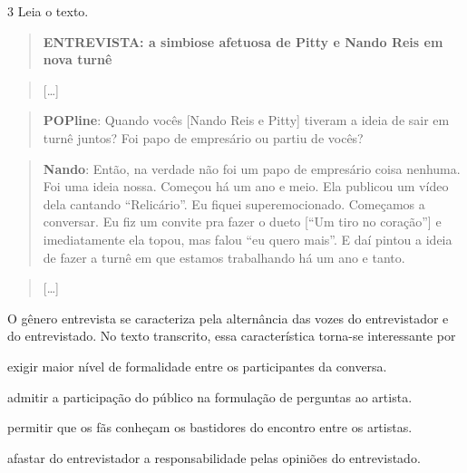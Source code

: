 \num{3} Leia o texto.

\begin{quote}
\textbf{ENTREVISTA: a simbiose afetuosa de Pitty e Nando Reis em nova
turnê}
\end{quote}

\begin{quote}
{[}\ldots{]}
\end{quote}

\begin{quote}
\textbf{POPline}: Quando vocês {[}Nando Reis e Pitty{]} tiveram a ideia
de sair em turnê juntos? Foi papo de empresário ou partiu de vocês?
\end{quote}

\begin{quote}
\textbf{Nando}: Então, na verdade não foi um papo de empresário coisa
nenhuma. Foi uma ideia nossa. Começou há um ano e meio. Ela publicou um
vídeo dela cantando ``Relicário''. Eu fiquei superemocionado. Começamos
a conversar. Eu fiz um convite pra fazer o dueto {[}``Um tiro no
coração''{]} e imediatamente ela topou, mas falou ``eu quero mais''. E
daí pintou a ideia de fazer a turnê em que estamos trabalhando há um ano
e tanto.
\end{quote}

\begin{quote}
{[}\ldots{]}
\end{quote}


O gênero entrevista se caracteriza pela alternância das vozes do
entrevistador e do entrevistado. No texto transcrito, essa
característica torna-se interessante por

\begin{escolha}
\item exigir maior nível de formalidade entre os participantes da conversa.

\item admitir a participação do público na formulação de perguntas ao
artista.

\item permitir que os fãs conheçam os bastidores do encontro entre os
artistas.

\item afastar do entrevistador a responsabilidade pelas opiniões do
entrevistado.
\end{escolha}

